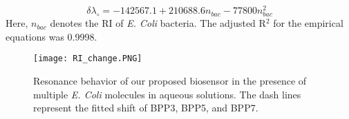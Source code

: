 \documentclass[conference]{IEEEtran}
\begin{document}
\begin{equation}
    \delta \lambda_{\circ} = -142567.1 + 210688.6 n_{bac} - 77800 n_{bac}^2
    \label{empirical}
\end{equation}
Here, $n_{bac}$ denotes the RI of \textit{E. Coli} bacteria. The adjusted R$^2$ for the empirical equations was 0.9998.
\begin{figure}[ht]
\centering
\texttt{[image: RI\_change.PNG]}
\caption{Resonance behavior of our proposed biosensor in the presence of multiple \textit{E. Coli} molecules in aqueous solutions. The dash lines represent the fitted shift of BPP3, BPP5, and BPP7.}
\label{RI change}
\end{figure}
\end{document}
